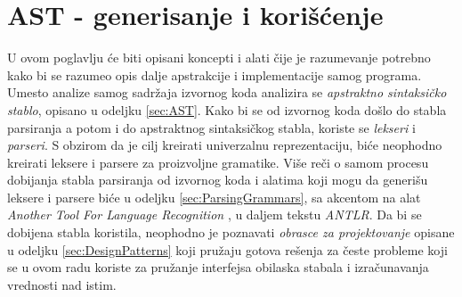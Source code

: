 \chapter{AST - generisanje i korišćenje}
\label{chp:RelevantTerms}

U ovom poglavlju će biti opisani koncepti i alati čije je razumevanje potrebno kako bi se razumeo opis dalje apstrakcije i implementacije samog programa. Umesto analize samog sadržaja izvornog koda analizira se \emph{apstraktno sintaksičko stablo}, opisano u odeljku \ref{sec:AST}. Kako bi se od izvornog koda došlo do stabla parsiranja a potom i do apstraktnog sintaksičkog stabla, koriste se \emph{lekseri} i \emph{parseri}. S obzirom da je cilj kreirati univerzalnu reprezentaciju, biće neophodno kreirati leksere i parsere za proizvoljne gramatike. Više reči o samom procesu dobijanja stabla parsiranja od izvornog koda i alatima koji mogu da generišu leksere i parsere biće u odeljku \ref{sec:ParsingGrammars}, sa akcentom na alat \emph{Another Tool For Language Recognition} \cite{ANTLR}, u daljem tekstu \emph{ANTLR}. Da bi se dobijena stabla koristila, neophodno je poznavati \emph{obrasce za projektovanje} opisane u odeljku \ref{sec:DesignPatterns} koji pružaju gotova rešenja za česte probleme koji se u ovom radu koriste za pružanje interfejsa obilaska stabala i izračunavanja vrednosti nad istim.





